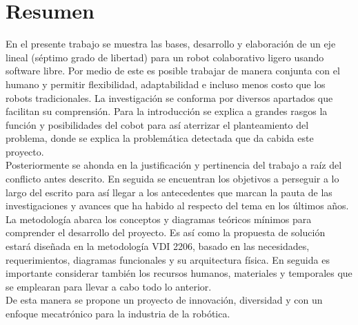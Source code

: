 \section{Resumen}
En el presente trabajo se muestra las bases, desarrollo y elaboración de un eje lineal (séptimo grado de libertad) para un robot colaborativo ligero usando software libre. Por medio de este es posible trabajar de manera conjunta con el humano y permitir flexibilidad, adaptabilidad e incluso menos costo que los robots tradicionales. La investigación se conforma por diversos apartados que facilitan su comprensión. Para la introducción se explica a grandes rasgos la función y posibilidades del cobot para así aterrizar el planteamiento del problema, donde se explica la problemática detectada que da cabida este proyecto.\\
Posteriormente se ahonda en la justificación y pertinencia del trabajo a raíz del conflicto antes descrito. En seguida se encuentran los objetivos a perseguir a lo largo del escrito para así llegar a los antecedentes que marcan la pauta de las investigaciones y avances que ha habido al respecto del tema en los últimos años.\\
La metodología abarca los conceptos y diagramas teóricos mínimos para comprender el desarrollo del proyecto. Es así como la propuesta de solución estará diseñada en la metodología VDI 2206, basado en las necesidades, requerimientos, diagramas funcionales y su arquitectura física. En seguida es importante considerar también los recursos humanos, materiales y temporales que se emplearan para llevar a cabo todo lo anterior. \\
De esta manera se propone un proyecto de innovación, diversidad y con un enfoque mecatrónico para la industria de la robótica.